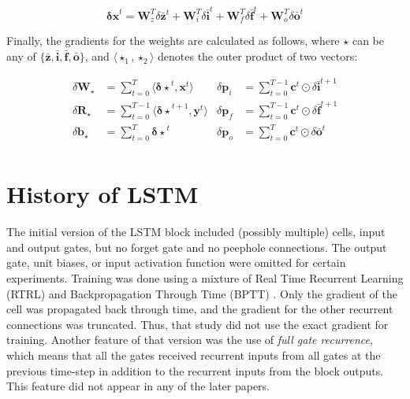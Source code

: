 \[
\mathbf{\delta x}^t = \mathbf{W}_z^T \delta \bar{\mathbf{z}}^t +
                      \mathbf{W}_i^T \delta \bar{\mathbf{i}}^t +
                      \mathbf{W}_f^T \delta \bar{\mathbf{f}}^t +
                      \mathbf{W}_o^T \delta \bar{\mathbf{o}}^t
\]

Finally, the gradients for the weights are calculated as follows, where
$\mathbf{\star}$ can be any of $\{\bar{\mathbf{z}}, \bar{\mathbf{i}}, \bar{\mathbf{f}}, \bar{\mathbf{o}}\}$, and $\langle \star_1, \star_2 \rangle$ denotes the outer product of two vectors:

\begin{align*}
    \delta\mathbf{W}_\star &= \sum^T_{t=0} \langle \mathbf{\delta\star}^t, \mathbf{x}^t \rangle
    & \delta\mathbf{p}_i &= \sum^{T-1}_{t=0}  \mathbf{c}^t \odot \delta \bar{\mathbf{i}}^{t+1}
    \\
    \delta\mathbf{R}_\star &= \sum^{T-1}_{t=0} \langle \mathbf{\delta\star}^{t+1}, \mathbf{y}^t \rangle
    & \delta\mathbf{p}_f &= \sum^{T-1}_{t=0}  \mathbf{c}^t \odot \delta \bar{\mathbf{f}}^{t+1}
    \\
    \delta\mathbf{b}_\star &= \sum^{T}_{t=0} \mathbf{\delta\star}^{t}
    & \delta\mathbf{p}_o &= \sum^{T}_{t=0}    \mathbf{c}^t \odot \delta \bar{\mathbf{o}}^{t}
    \\
\end{align*}

\section{History of LSTM}
\label{sec:history}

The initial version of the LSTM block \cite{Hochreiter1995,Hochreiter1997} included (possibly multiple) cells, input and output gates, but no forget gate and no peephole connections. The output gate, unit biases, or input activation function were omitted for certain experiments. Training was done using a mixture of Real Time Recurrent Learning (RTRL) \cite{Robinson1987, Williams1989} and Backpropagation Through Time (BPTT) \cite{Werbos1988, Williams1989}. Only the gradient of the cell was propagated back through time, and the gradient for the other recurrent connections was truncated. Thus, that study did not use the exact gradient for training. Another feature of that version was the use of \emph{full gate recurrence}, which means that all the gates received recurrent inputs from all gates at the previous time-step in addition to the recurrent inputs from the block outputs. This feature did not appear in any of the later papers. 

